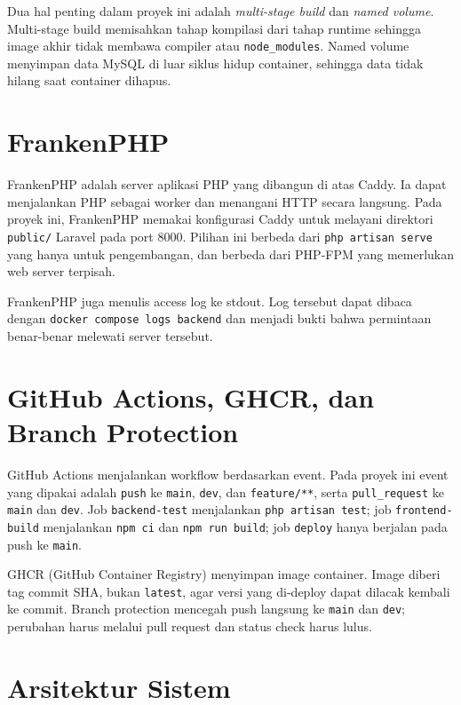 \documentclass[12pt,a4paper,oneside]{book}
\begin{document}
Dua hal penting dalam proyek ini adalah \emph{multi-stage build} dan \emph{named
volume}. Multi-stage build memisahkan tahap kompilasi dari tahap runtime sehingga
image akhir tidak membawa compiler atau \texttt{node\_modules}. Named volume
menyimpan data MySQL di luar siklus hidup container, sehingga data tidak hilang
saat container dihapus.

\section{FrankenPHP}

FrankenPHP adalah server aplikasi PHP yang dibangun di atas Caddy. Ia dapat
menjalankan PHP sebagai worker dan menangani HTTP secara langsung. Pada proyek ini,
FrankenPHP memakai konfigurasi Caddy untuk melayani direktori \texttt{public/}
Laravel pada port 8000. Pilihan ini berbeda dari \texttt{php artisan serve} yang
hanya untuk pengembangan, dan berbeda dari PHP-FPM yang memerlukan web server
terpisah.

FrankenPHP juga menulis access log ke stdout. Log tersebut dapat dibaca dengan
\texttt{docker compose logs backend} dan menjadi bukti bahwa permintaan benar-benar
melewati server tersebut.

\section{GitHub Actions, GHCR, dan Branch Protection}

GitHub Actions menjalankan workflow berdasarkan event. Pada proyek ini event yang
dipakai adalah \texttt{push} ke \texttt{main}, \texttt{dev}, dan \texttt{feature/**},
serta \texttt{pull\_request} ke \texttt{main} dan \texttt{dev}. Job
\texttt{backend-test} menjalankan \texttt{php artisan test}; job
\texttt{frontend-build} menjalankan \texttt{npm ci} dan \texttt{npm run build};
job \texttt{deploy} hanya berjalan pada push ke \texttt{main}.

GHCR (GitHub Container Registry) menyimpan image container. Image diberi tag commit
SHA, bukan \texttt{latest}, agar versi yang di-deploy dapat dilacak kembali ke
commit. Branch protection mencegah push langsung ke \texttt{main} dan \texttt{dev};
perubahan harus melalui pull request dan status check harus lulus.

\section{Arsitektur Sistem}
\end{document}
